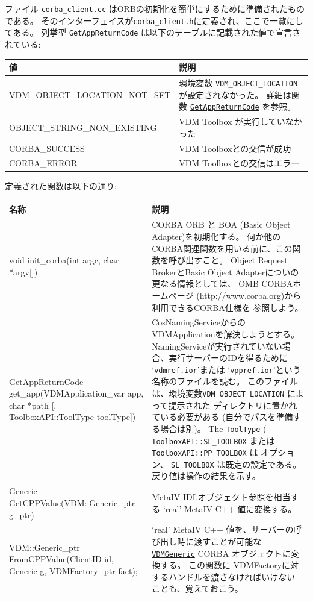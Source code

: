 \documentclass[\pformat,12pt]{jarticle}
\newcommand{\pbs}[1]{\let\temp=\\#1\let\\=\temp}
\newenvironment{interfacetable}{%
  \begin{longtable}{|>{\pbs\raggedright\ttfamily}p{6.6cm}%
                    |>{\pbs\raggedright}p{6.6cm}|} \hline
  \textrm{\bfseries 名称} &  \textbf{説明} \\ \hline
  \endhead
  }{\end{longtable}}
\newcommand{\Generic}{\hyperlink{interface.Generic}{Generic}}
\newcommand{\VDMGeneric}{\hyperlink{interface.Generic}{VDMGeneric}}
\newcommand{\ClientID}{\hyperlink{type.ClientID}{ClientID}}
\begin{document}
ファイル \texttt{corba\_client.cc} はORBの初期化を簡単にするために準備されたものである。
そのインターフェイスが\texttt{corba\_client.h}に定義され、ここで一覧にしてある。
列挙型 \texttt{GetAppReturnCode} は以下のテーブルに記載された値で宣言されている: 

\begin{longtable}{|>{\pbs\raggedright\ttfamily}p{6.6cm}|>{\pbs\raggedright}p{6.6cm}|} \hline
\textrm{\bfseries 値} & \textrm{\bfseries 説明}  \\ \hline
  VDM\_OBJECT\_LOCATION\_NOT\_SET
  & 環境変数 \texttt{VDM\_OBJECT\_LOCATION} が設定されなかった。
    詳細は関数
    \hyperlink{cppclient.GetAppReturnCode}{\texttt{GetAppReturnCode}}
    を参照。
\\ \hline
  OBJECT\_STRING\_NON\_EXISTING
  & VDM Toolbox が実行していなかった
\\ \hline
  CORBA\_SUCCESS
  & VDM Toolboxとの交信が成功
\\ \hline
  CORBA\_ERROR
  & VDM Toolboxとの交信はエラー
\\ \hline
\end{longtable}

定義された関数は以下の通り:

\begin{interfacetable}
void init\_corba(int argc, char *argv[])
  &  CORBA ORB と BOA (Basic Object Adapter)を初期化する。
    何か他のCORBA関連関数を用いる前に、この関数を呼び出すこと。
    Object Request BrokerとBasic Object Adapterについの更なる情報としては、
    OMB CORBAホームページ (http://www.corba.org)から利用できるCORBA仕様を
    参照しよう。
\\ \hline
\hyperdef{cppclient}{GetAppReturnCode}
GetAppReturnCode get\_app(VDMApplication\_var app, char *path [, ToolboxAPI::ToolType toolType])
  & CosNamingServiceからのVDMApplicationを解決しようとする。
    NamingServiceが実行されていない場合、実行サーバーのIDを得るために
    `{\tt vdmref.ior}'または `{\tt vppref.ior}'という名称のファイルを読む。
    このファイルは、環境変数\texttt{VDM\_OBJECT\_LOCATION} によって提示された
    ディレクトリに置かれている必要がある (自分でパスを準備する場合は別)。 
    The {\tt ToolType}
    ( {\tt ToolboxAPI::SL\_TOOLBOX} または {\tt ToolboxAPI::PP\_TOOLBOX} は
    オプション、 {\tt SL\_TOOLBOX} は既定の設定である。
    戻り値は操作の結果を示す。
\\ \hline
{\Generic} GetCPPValue(VDM::Generic\_ptr g\_ptr)
  &  MetaIV-IDLオブジェクト参照を相当する `real' MetaIV C++ 値に変換する。
\\ \hline
VDM::Generic\_ptr FromCPPValue({\ClientID} id, {\Generic} g, VDMFactory\_ptr fact);
  &   `real' MetaIV C++ 値を、サーバーの呼び出し時に渡すことが可能な
     \texttt{\VDMGeneric} CORBA オブジェクトに変換する。
    この関数に VDMFactoryに対するハンドルを渡さなければいけない
    ことも、覚えておこう。
\\ \hline
\end{interfacetable}
\end{document}
